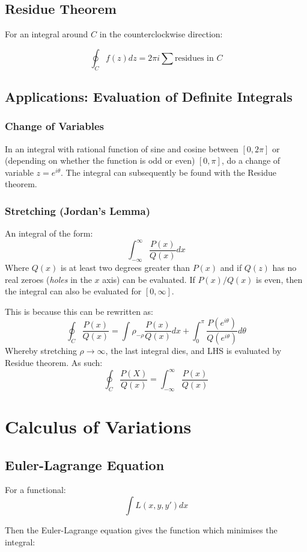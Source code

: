 \documentclass[12pt]{article}
\begin{document}
\subsection{Residue Theorem}
For an integral around $C$ in the counterclockwise direction:

\[\oint_Cf(z)dz = 2\pi i \sum \text{residues in } C\]

\subsection{Applications: Evaluation of Definite Integrals}

\subsubsection{Change of Variables}
In an integral with rational function of sine and cosine between $[0,2\pi]$ or (depending on whether the function is odd or even) $[0,\pi]$, do a change of variable $z = e^{i\theta}$. The integral can subsequently be found with the Residue theorem.

\subsubsection{Stretching (Jordan's Lemma)}
An integral of the form:
\[ \int^\infty_{-\infty}\frac{P(x)}{Q(x)}dx\]
Where $Q(x)$ is at least two degrees greater than $P(x)$ and if $Q(z)$ has no real zeroes (\textit{holes} in the $x$ axis) can be evaluated. If $P(x)/Q(x)$ is even, then the integral can also be evaluated for $[0,\infty]$.

This is because this can be rewritten as:
\[\oint_C\frac{P(x)}{Q(x)} = \int\rho_{-\rho}\frac{P(x)}{Q(x)}dx + \int_0^\pi \frac{P(e^{i\theta})}{Q(e^{i\theta})}d\theta\]
Whereby stretching $\rho\to\infty$, the last integral dies, and LHS is evaluated by Residue theorem. As such:
\[\oint_C \frac{P(X)}{Q(x)} = \int^\infty_{-\infty}\frac{P(x)}{Q(x)}\]


\section{Calculus of Variations}

\subsection{Euler-Lagrange Equation}
For a functional:
\[ \int L(x,y,y') dx\]

Then the Euler-Lagrange equation gives the function which minimises the integral:
\end{document}
